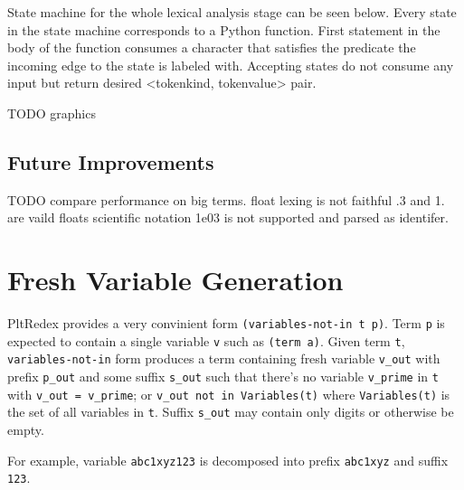 State machine for the whole lexical analysis stage can be seen below. Every state in the state machine corresponds to a Python function. First statement in the body of the function consumes a character that satisfies the predicate the incoming edge to the state is labeled with. Accepting states do not consume any input but return desired <tokenkind, tokenvalue> pair.


TODO graphics


\subsection{Future Improvements}
TODO compare performance on big terms. 
float lexing is not faithful .3 and 1. are vaild floats
scientific notation 1e03 is not supported and parsed as identifer.


\section{Fresh Variable Generation}
PltRedex provides a very convinient form \texttt{(variables-not-in t p)}. Term \texttt{p} is expected to contain a single variable \texttt{v} such as \texttt{(term a)}. Given term \texttt{t}, \texttt{variables-not-in} form produces a term containing fresh variable \texttt{v\_out} with prefix \texttt{p\_out} and some suffix \texttt{s\_out} such that there's no variable \texttt{v\_prime} in \texttt{t} with \texttt{v\_out = v\_prime}; or \texttt{v\_out not in Variables(t)} where \texttt{Variables(t)} is the set of all variables in \texttt{t}. Suffix \texttt{s\_out} may contain only digits or otherwise be empty. 

For example, variable \texttt{abc1xyz123} is decomposed into prefix \texttt{abc1xyz} and suffix \texttt{123}.

